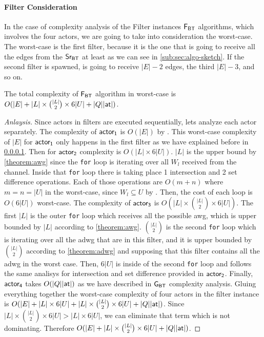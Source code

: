 \paragraph{Filter Consideration}\label{comp:an:filter:note} In the case of complexity analysis of the Filter instances $\mathsf{F_{BT}}$ algorithms, which involves the four actors, we are going to take into consideration the worst-case.
The worst-case is the first filter, because it is the one that is going to receive all the edges from the $\mathsf{Sr_{BT}}$ at least as we can see in \autoref{sub:sec:algo-sketch}. 
If the second filter is spawned, is going to receive $|E|-2$ edges, the third $|E|-3$, and so on. 

\begin{complexity}
The total complexity of $\mathsf{F_{BT}}$ algorithm in worst-case is $O(|E| + |L| \times \binom{|L|}{2} \times 6|U| + |Q||\mathsf{at}|)$.
\end{complexity}
\begin{proof}[Anlaysis]
Since actors in filters are executed sequentially, lets analyze each actor separately. 
The complexity of $\mathsf{actor_1}$ is $O(|E|)$ by . 
This worst-case complexity of $|E|$ for $\mathsf{actor_1}$ only happens in the first filter as we have explained before in \ref{comp:an:filter:note}. 
Then for $\mathsf{actor_2}$ complexity is $O(|L| \times 6|U|)$. $|L|$ is the upper bound by \autoref{theorem:awg} since the \texttt{for} loop is iterating over all $W_l$ received from the channel.
Inside that \texttt{for} loop there is taking place 1 intersection and 2 set difference operations. Each of those operations are $O(m+n)$ where $m = n = |U|$ in the worst-case, since $W_l \subseteq U$ by . 
Then, the cost of each loop is $O(6|U|)$ worst-case.  
The complexity of $\mathsf{actor_3}$ is $O(|L| \times \binom{|L|}{2} \times 6|U|)$. The first $|L|$ is the outer \texttt{for} loop which receives all the possible \acrshort{awg}, which is upper bounded by $|L|$ according to \autoref{theorem:awg}.
$\binom{|L|}{2}$ is the second \texttt{for} loop which is iterating over all the \acrshort{adwg} that are in this filter, and it is upper bounded by $\binom{|L|}{2}$ according to \autoref{theorem:adwg} and supposing that this filter contains all the \acrshort{adwg} in the worst case. 
Then, $6|U|$ is inside of the second \texttt{for} loop and follows the same analisys for intersection and set difference provided in $\mathsf{actor_2}$. Finally, $\mathsf{actor_4}$ takes $O(|Q||\mathsf{at}|)$ as we have described in $\mathsf{G_{BT}}$ complexity analysis.
Gluing everything together the worst-case complexity of four actors in the filter instance is $O(|E| + |L| \times 6|U| + |L| \times \binom{|L|}{2} \times 6|U| + |Q||\mathsf{at}|)$. 
Since $|L| \times \binom{|L|}{2} \times 6|U| > |L| \times 6|U|$, we can eliminate that term which is not dominating. Therefore $O(|E| + |L| \times \binom{|L|}{2} \times 6|U| + |Q||\mathsf{at}|)$.

\end{proof}
      
